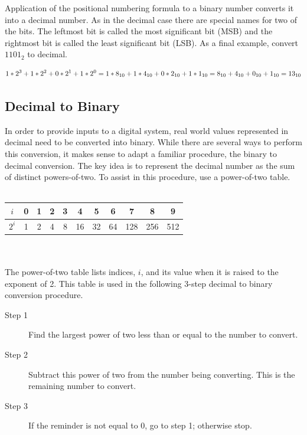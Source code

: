Application of the positional numbering formula to a binary number
converts it into a decimal number.  As in the decimal case
there are special names for two of the bits. The leftmost bit is
called the most significant bit (MSB) and the
rightmost bit is called the least significant
bit (LSB).  As a final example, convert $1101_2$ to decimal.

$$1*2^3 + 1*2^2 + 0*2^1 + 1*2^0 = \\
1*8_{10} + 1*4_{10} + 0*2_{10} + 1*1_{10} = \\
8_{10} + 4_{10} + 0_{10} + 1_{10} = 13_{10}$$
\label{page:bin2dec}

\subsection{Decimal to Binary}
In order to provide inputs to a digital system, real world values
represented in decimal need to be converted into binary.
While there are several ways to perform
this conversion, it makes sense to adapt a familiar procedure,
the binary to decimal conversion.  The key idea is to represent the
decimal number as the sum of distinct powers-of-two.  To assist in this
procedure, use a power-of-two table.
\\ \\
\begin{tabular}{|c|c|c|c|c|c|c|c|c|c|c|}\hline
    $i$   & 0 & 1 &  2 &  3 &  4 &  5 &  6 &  7  &  8  &  9  \\ \hline
    $2^i$ & 1 & 2 &  4 &  8 & 16 & 32 & 64 & 128 & 256 &  512\\ \hline
\end{tabular}
\\ \\
The power-of-two table lists indices, $i$, and its value when it is
raised to the exponent of 2.  This table is used in the following
3-step decimal to binary conversion procedure.

\begin{description}
    \item [Step 1] Find the largest power of two less than or equal to the
        number to convert.
    \item [Step 2] Subtract this power of two from the number being converting.
        This is the remaining number to convert.
    \item [Step 3] If the reminder is not equal to 0, go to step 1; otherwise stop.
\end{description}

